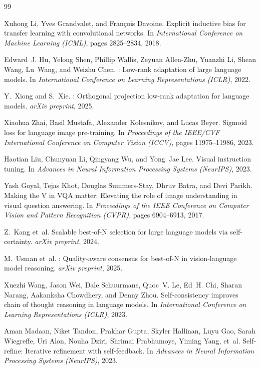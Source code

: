 \documentclass{article}
\begin{document}
\clearpage
\begin{thebibliography}{99}

Xuhong Li, Yves Grandvalet, and Fran{\c{c}}ois Davoine.
\newblock Explicit inductive bias for transfer learning with convolutional networks.
\newblock In \emph{International Conference on Machine Learning (ICML)}, pages 2825--2834, 2018.

Edward~J. Hu, Yelong Shen, Phillip Wallis, Zeyuan Allen-Zhu, Yuanzhi Li, Shean Wang, Lu~Wang, and Weizhu Chen.
: Low-rank adaptation of large language models.
\newblock In \emph{International Conference on Learning Representations (ICLR)}, 2022.

Y.~Xiong and S.~Xie.
: Orthogonal projection low-rank adaptation for language models.
\newblock \emph{arXiv preprint}, 2025.

Xiaohua Zhai, Basil Mustafa, Alexander Kolesnikov, and Lucas Beyer.
\newblock Sigmoid loss for language image pre-training.
\newblock In \emph{Proceedings of the IEEE/CVF International Conference on Computer Vision (ICCV)}, pages 11975--11986, 2023.

Haotian Liu, Chunyuan Li, Qingyang Wu, and Yong~Jae Lee.
\newblock Visual instruction tuning.
\newblock In \emph{Advances in Neural Information Processing Systems (NeurIPS)}, 2023.

Yash Goyal, Tejas Khot, Douglas Summers-Stay, Dhruv Batra, and Devi Parikh.
\newblock Making the {V} in {VQA} matter: Elevating the role of image understanding in visual question answering.
\newblock In \emph{Proceedings of the IEEE Conference on Computer Vision and Pattern Recognition (CVPR)}, pages 6904--6913, 2017.

Z.~Kang et~al.
\newblock Scalable best-of-{N} selection for large language models via self-certainty.
\newblock \emph{arXiv preprint}, 2024.

M.~Usman et~al.
: Quality-aware consensus for best-of-{N} in vision-language model reasoning.
\newblock \emph{arXiv preprint}, 2025.

Xuezhi Wang, Jason Wei, Dale Schuurmans, Quoc~V. Le, Ed~H. Chi, Sharan Narang, Aakanksha Chowdhery, and Denny Zhou.
\newblock Self-consistency improves chain of thought reasoning in language models.
\newblock In \emph{International Conference on Learning Representations (ICLR)}, 2023.

Aman Madaan, Niket Tandon, Prakhar Gupta, Skyler Hallinan, Luyu Gao, Sarah Wiegreffe, Uri Alon, Nouha Dziri, Shrimai Prabhumoye, Yiming Yang, et~al.
\newblock Self-refine: Iterative refinement with self-feedback.
\newblock In \emph{Advances in Neural Information Processing Systems (NeurIPS)}, 2023.

\end{thebibliography}
\end{document}
